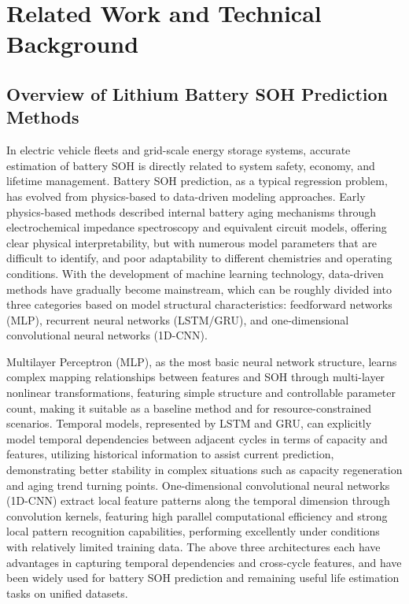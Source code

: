 \documentclass[10pt,a4paper]{article}
\begin{document}
\section{Related Work and Technical Background}\label{sec:related}

\subsection{Overview of Lithium Battery SOH Prediction Methods}

In electric vehicle fleets and grid-scale energy storage systems, accurate estimation of battery SOH is directly related to system safety, economy, and lifetime management. Battery SOH prediction, as a typical regression problem, has evolved from physics-based to data-driven modeling approaches\cite{liu2025deep}. Early physics-based methods described internal battery aging mechanisms through electrochemical impedance spectroscopy and equivalent circuit models, offering clear physical interpretability, but with numerous model parameters that are difficult to identify, and poor adaptability to different chemistries and operating conditions. With the development of machine learning technology, data-driven methods have gradually become mainstream\cite{liu2025deep}, which can be roughly divided into three categories based on model structural characteristics: feedforward networks (MLP), recurrent neural networks (LSTM/GRU), and one-dimensional convolutional neural networks (1D-CNN).

Multilayer Perceptron (MLP), as the most basic neural network structure, learns complex mapping relationships between features and SOH through multi-layer nonlinear transformations, featuring simple structure and controllable parameter count, making it suitable as a baseline method and for resource-constrained scenarios\cite{bairwa2025cycle}. Temporal models, represented by LSTM and GRU, can explicitly model temporal dependencies between adjacent cycles in terms of capacity and features, utilizing historical information to assist current prediction, demonstrating better stability in complex situations such as capacity regeneration and aging trend turning points. One-dimensional convolutional neural networks (1D-CNN) extract local feature patterns along the temporal dimension through convolution kernels, featuring high parallel computational efficiency and strong local pattern recognition capabilities, performing excellently under conditions with relatively limited training data\cite{zhang2024cnnsoh}. The above three architectures each have advantages in capturing temporal dependencies and cross-cycle features, and have been widely used for battery SOH prediction and remaining useful life estimation tasks on unified datasets\cite{bairwa2025cycle}.
\end{document}
